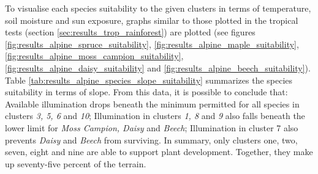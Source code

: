 To visualise each species suitability to the given clusters in terms of temperature, soil moisture and sun exposure, graphs similar to those plotted in the tropical tests (section \ref{sec:results_trop_rainforest}) are plotted (see figures \ref{fig:results_alpine_spruce_suitability}, \ref{fig:results_alpine_maple_suitability}, \ref{fig:results_alpine_moss_campion_suitability}, \ref{fig:results_alpine_daisy_suitability} and \ref{fig:results_alpine_beech_suitability}). Table \ref{tab:results_alpine_species_slope_suitability} summarizes the species suitability in terms of slope. From this data, it is possible to conclude that: Available illumination drops beneath the minimum permitted for all species in clusters \textit{3, 5, 6} and \textit{10}; Illumination in clusters \textit{1, 8} and \textit{9} also falls beneath the lower limit for \textit{Moss Campion, Daisy} and \textit{Beech}; Illumination in cluster 7 also prevents \textit{Daisy} and \textit{Beech} from surviving. In summary, only clusters one, two, seven, eight and nine are able to support plant development. Together, they make up seventy-five percent of the terrain.\\

